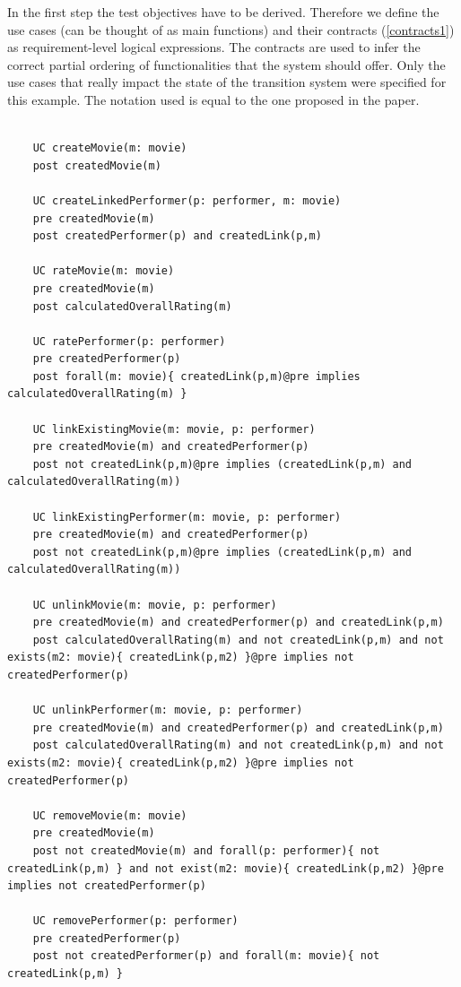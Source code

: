 In the first step the test objectives have to be derived. Therefore we define the use cases (can be thought of as main functions) and their contracts (\autoref{contracts1}) as requirement-level logical expressions. The contracts are used to infer the correct partial ordering of functionalities that the system should offer. Only the use cases that really impact the state of the transition system were specified for this example. The notation used is equal to the one proposed in the paper. 

\begin{lstlisting}[caption={Contracts attached to use cases},label={contracts1}]
	
	UC createMovie(m: movie)
	post createdMovie(m)
	
	UC createLinkedPerformer(p: performer, m: movie)
	pre createdMovie(m)
	post createdPerformer(p) and createdLink(p,m)
	
	UC rateMovie(m: movie)
	pre createdMovie(m)
	post calculatedOverallRating(m)
	
	UC ratePerformer(p: performer)
	pre createdPerformer(p)
	post forall(m: movie){ createdLink(p,m)@pre implies calculatedOverallRating(m) }
	
	UC linkExistingMovie(m: movie, p: performer)
	pre createdMovie(m) and createdPerformer(p)
	post not createdLink(p,m)@pre implies (createdLink(p,m) and calculatedOverallRating(m))
	
	UC linkExistingPerformer(m: movie, p: performer)
	pre createdMovie(m) and createdPerformer(p)
	post not createdLink(p,m)@pre implies (createdLink(p,m) and calculatedOverallRating(m))
	
	UC unlinkMovie(m: movie, p: performer)
	pre createdMovie(m) and createdPerformer(p) and createdLink(p,m)
	post calculatedOverallRating(m) and not createdLink(p,m) and not exists(m2: movie){ createdLink(p,m2) }@pre implies not createdPerformer(p)
	
	UC unlinkPerformer(m: movie, p: performer)
	pre createdMovie(m) and createdPerformer(p) and createdLink(p,m)
	post calculatedOverallRating(m) and not createdLink(p,m) and not exists(m2: movie){ createdLink(p,m2) }@pre implies not createdPerformer(p)
	
	UC removeMovie(m: movie)
	pre createdMovie(m)
	post not createdMovie(m) and forall(p: performer){ not createdLink(p,m) } and not exist(m2: movie){ createdLink(p,m2) }@pre implies not createdPerformer(p)
	
	UC removePerformer(p: performer)
	pre createdPerformer(p)
	post not createdPerformer(p) and forall(m: movie){ not createdLink(p,m) }
\end{lstlisting}

